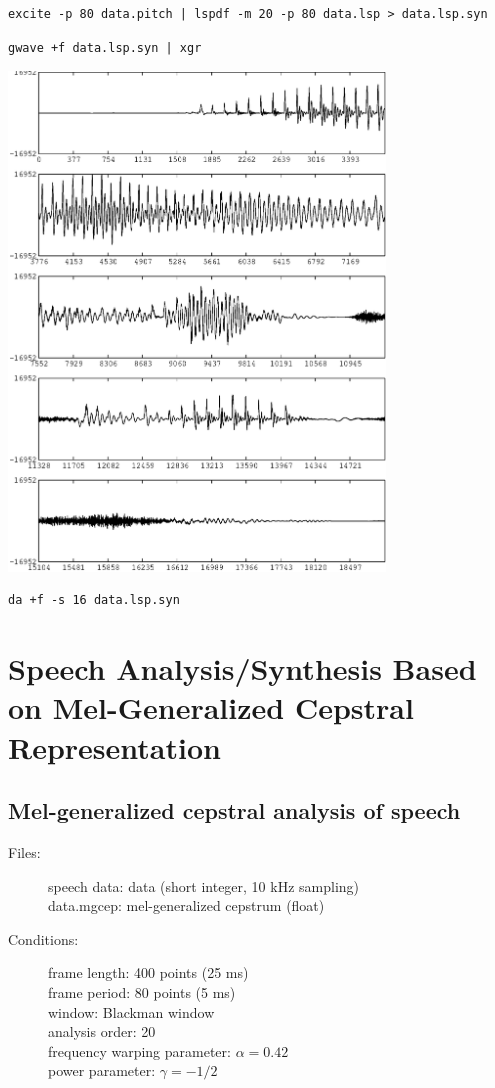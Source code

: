 \documentclass[a4paper,10pt]{article}
\begin{document}
\begin{verbatim}
excite -p 80 data.pitch | lspdf -m 20 -p 80 data.lsp > data.lsp.syn
\end{verbatim}

\begin{verbatim}
gwave +f data.lsp.syn | xgr
\end{verbatim}

\includegraphics[width=10cm]{eps/data.lsp.syn.gwave.eps}

\begin{verbatim}
da +f -s 16 data.lsp.syn
\end{verbatim}

\section{Speech Analysis/Synthesis 
        Based on Mel-Generalized Cepstral Representation}

\subsection{Mel-generalized cepstral analysis of speech}

\begin{description}
\item[Files:]
   speech data: data (short integer, 10 kHz sampling)\\
   data.mgcep: mel-generalized cepstrum (float)
\item[Conditions:]
  frame length: 400 points (25 ms)\\
  frame period: 80 points (5 ms)\\
  window: Blackman window\\
  analysis order: 20\\
  frequency warping parameter: $\alpha = 0.42$\\
  power parameter:     $\gamma = -1/2$
\end{description}
\end{document}
